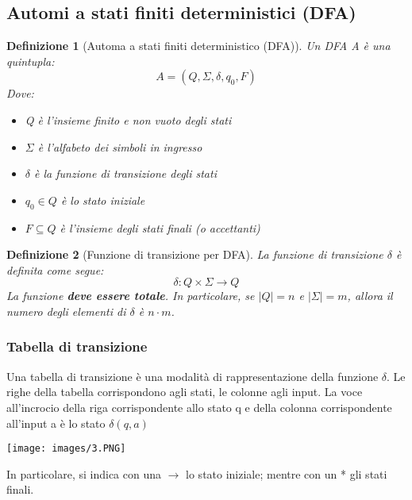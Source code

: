 \documentclass[12pt]{article}
\newtheorem{Definizione}{Definizione}[subsection]
\begin{document}
\subsection{Automi a stati finiti deterministici (DFA)}
\begin{Definizione}[Automa a stati finiti deterministico (DFA)]
    Un DFA A è una quintupla: $$A = (Q, \Sigma, \delta, q_0, F)$$
    Dove:
    \begin{itemize}
        \item Q è l'insieme finito e non vuoto degli stati
        \item $\Sigma$ è l'alfabeto dei simboli in ingresso
        \item $\delta$ è la funzione di transizione degli stati
        \item $q_0 \in Q$ è lo stato iniziale
        \item $F \subseteq Q$ è l'insieme degli stati finali (o accettanti)
    \end{itemize}
\end{Definizione}
\begin{Definizione}[Funzione di transizione per DFA]
La funzione di transizione $\delta$ è definita come segue:
$$\delta: Q \times \Sigma \to Q$$
La funzione \textbf{deve essere totale}. In particolare, se $|Q| = n$ e $|\Sigma| = m$, allora il numero degli elementi di $\delta$ è $n \cdot m$.
\end{Definizione}
\subsubsection{Tabella di transizione}
Una tabella di transizione è una modalità di rappresentazione della funzione $\delta$. Le righe della tabella corrispondono agli stati, le colonne agli input. La voce all’incrocio della riga corrispondente allo stato q e della colonna corrispondente all’input a è lo stato $\delta(q, a)$
\begin{center}
    \texttt{[image: images/3.PNG]}
\end{center}
In particolare, si indica con una $\to$ lo stato iniziale; mentre con un * gli stati finali.
\end{document}
